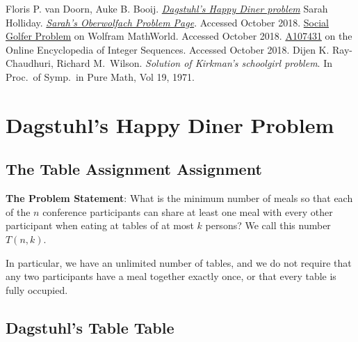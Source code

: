 \documentclass[a4paper]{article}
\begin{document}
\begin{thebibliography}{0}
  Floris P. van Doorn, Auke B. Booij.
  \href{https://github.com/fpvandoorn/Dagstuhl-tables/}{\textsl{Dagstuhl's
    Happy Diner problem}}
 Sarah Holliday.  \href{http://facultyweb.kennesaw.edu/shollid4/oberwolfach.php}{\textsl{Sarah's Oberwolfach
    Problem Page}}. Accessed October 2018.
  \href{http://mathworld.wolfram.com/SocialGolferProblem.html}{Social
    Golfer Problem} on Wolfram MathWorld.  Accessed October 2018.
 \href{https://oeis.org/A107431}{A107431} on the
  Online Encyclopedia of Integer Sequences. Accessed October 2018.
 Dijen K. Ray-Chaudhuri, Richard
  M.\ Wilson. \textsl{Solution of Kirkman's schoolgirl problem}. In
  Proc.\ of Symp.\ in Pure Math, Vol 19, 1971.
\end{thebibliography}
\section{Dagstuhl's Happy Diner
Problem}\label{dagstuhls-happy-diner-problem}

\subsection{The Table Assignment
Assignment}\label{the-table-assignment-assignment}

\textbf{The Problem Statement}: What is the minimum number of meals so
that each of the $n$ conference participants can share at least
one meal with every other participant when eating at tables of at most
$k$ persons? We call this number $T(n,k)$.

In particular, we have an unlimited number of tables, and we do not
require that any two participants have a meal together exactly once, or
that every table is fully occupied.

\subsection{Dagstuhl's Table Table}\label{dagstuhls-table-table}
\end{document}

